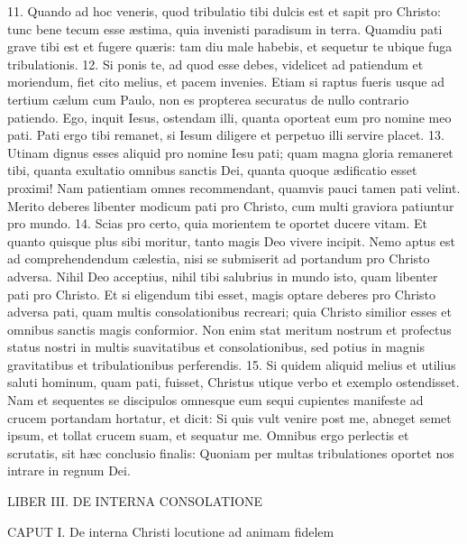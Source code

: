 \documentclass[twoside]{article}
\begin{document}
11. Quando ad hoc veneris, quod tribulatio tibi dulcis est et sapit pro Christo: tunc bene tecum esse æstima, quia invenisti paradisum in terra. Quamdiu pati grave tibi est et fugere quæris: tam diu male habebis, et sequetur te ubique fuga tribulationis.
12. Si ponis te, ad quod esse debes, videlicet ad patiendum et moriendum, fiet cito melius, et pacem invenies. Etiam si raptus fueris usque ad tertium cælum cum Paulo, non es propterea securatus de nullo contrario patiendo. Ego, inquit Iesus, ostendam illi, quanta oporteat eum pro nomine meo pati. Pati ergo tibi remanet, si Iesum diligere et perpetuo illi servire placet.
13. Utinam dignus esses aliquid pro nomine Iesu pati; quam magna gloria remaneret tibi, quanta exultatio omnibus sanctis Dei, quanta quoque ædificatio esset proximi! Nam patientiam omnes recommendant, quamvis pauci tamen pati velint. Merito deberes libenter modicum pati pro Christo, cum multi graviora patiuntur pro mundo.
14. Scias pro certo, quia morientem te oportet ducere vitam. Et quanto quisque plus sibi moritur, tanto magis Deo vivere incipit. Nemo aptus est ad comprehendendum cælestia, nisi se submiserit ad portandum pro Christo adversa. Nihil Deo acceptius, nihil tibi salubrius in mundo isto, quam libenter pati pro Christo. Et si eligendum tibi esset, magis optare deberes pro Christo adversa pati, quam multis consolationibus recreari; quia Christo similior esses et omnibus sanctis magis conformior. Non enim stat meritum nostrum et profectus status nostri in multis suavitatibus et consolationibus, sed potius in magnis gravitatibus et tribulationibus perferendis.
15. Si quidem aliquid melius et utilius saluti hominum, quam pati, fuisset, Christus utique verbo et exemplo ostendisset. Nam et sequentes se discipulos omnesque eum sequi cupientes manifeste ad crucem portandam hortatur, et dicit: Si quis vult venire post me, abneget semet ipsum, et tollat crucem suam, et sequatur me. Omnibus ergo perlectis et scrutatis, sit hæc conclusio finalis: Quoniam per multas tribulationes oportet nos intrare in regnum Dei.




LIBER III.
DE INTERNA CONSOLATIONE


CAPUT I.
De interna Christi locutione ad animam fidelem
\end{document}
